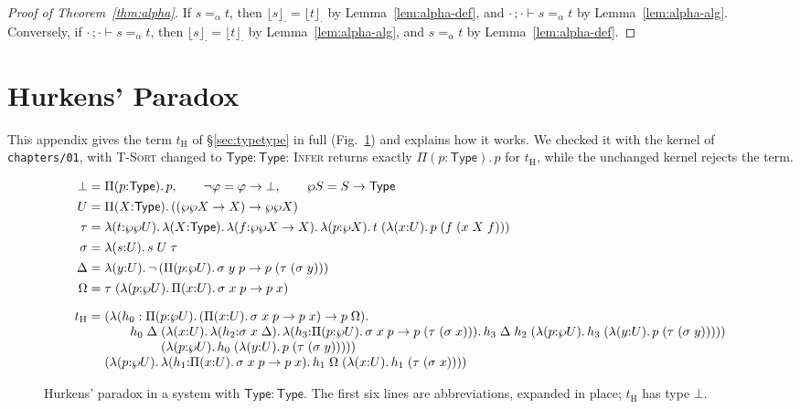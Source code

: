 \documentclass[acmsmall,screen,nonacm]{acmart}
\newcommand{\tPi}[3]{\Pi(#1{:}#2).\,#3}
\newcommand{\tLam}[3]{\lambda(#1{:}#2).\,#3}
\newcommand{\alphaeq}{=_{\alpha}}
\newcommand{\db}[2]{\lfloor #1 \rfloor_{#2}}
\begin{document}
\begin{proof}[Proof of Theorem~\ref{thm:alpha}]
If $s \alphaeq t$, then $\db{s}{\cdot} = \db{t}{\cdot}$ by Lemma~\ref{lem:alpha-def}, and $\cdot\,;\cdot \vdash s \alphaeq t$ by Lemma~\ref{lem:alpha-alg}.
Conversely, if $\cdot\,;\cdot \vdash s \alphaeq t$, then $\db{s}{\cdot} = \db{t}{\cdot}$ by Lemma~\ref{lem:alpha-alg}, and $s \alphaeq t$ by Lemma~\ref{lem:alpha-def}.
\end{proof}

\section{Hurkens' Paradox}
\label{app:hurkens}

This appendix gives the term $t_{\mathrm{H}}$ of \S\ref{sec:typetype} in full (Fig.~\ref{fig:hurkens}) and explains how it works.
We checked it with the kernel of \texttt{chapters/01}, with \textsc{T-Sort} changed to $\mathsf{Type} : \mathsf{Type}$:
\textsc{Infer} returns exactly $\tPi{p}{\mathsf{Type}}{p}$ for $t_{\mathrm{H}}$, while the unchanged kernel rejects the term.

\begin{figure}[ht]
\footnotesize
\[
\begin{array}{r@{\;}c@{\;}l}
\bot &=& \tPi{p}{\mathsf{Type}}{p}, \qquad \neg\varphi = \varphi \to \bot, \qquad \wp S = S \to \mathsf{Type} \\[4pt]
U &=& \tPi{X}{\mathsf{Type}}{((\wp\wp X \to X) \to \wp\wp X)} \\[4pt]
\tau &=& \tLam{t}{\wp\wp U}{\tLam{X}{\mathsf{Type}}{\tLam{f}{\wp\wp X \to X}{\tLam{p}{\wp X}{t\;(\tLam{x}{U}{p\;(f\;(x\;X\;f))})}}}} \\[4pt]
\sigma &=& \tLam{s}{U}{s\;U\;\tau} \\[4pt]
\Delta &=& \tLam{y}{U}{\neg\,(\tPi{p}{\wp U}{\sigma\;y\;p \to p\;(\tau\;(\sigma\;y))})} \\[4pt]
\Omega &=& \tau\;(\tLam{p}{\wp U}{\tPi{x}{U}{\sigma\;x\;p \to p\;x}}) \\[10pt]
t_{\mathrm{H}} &=& (\lambda (h_0 : \tPi{p}{\wp U}{(\tPi{x}{U}{\sigma\;x\;p \to p\;x}) \to p\;\Omega}).\; \\
&& \qquad h_0\;\Delta\;(\tLam{x}{U}{\tLam{h_2}{\sigma\;x\;\Delta}{\tLam{h_3}{\tPi{p}{\wp U}{\sigma\;x\;p \to p\;(\tau\;(\sigma\;x))}}{
     h_3\;\Delta\;h_2\;(\tLam{p}{\wp U}{h_3\;(\tLam{y}{U}{p\;(\tau\;(\sigma\;y))})})}}}) \\
&& \qquad\phantom{h_0\;\Delta\;}(\tLam{p}{\wp U}{h_0\;(\tLam{y}{U}{p\;(\tau\;(\sigma\;y))})})) \\
&& (\tLam{p}{\wp U}{\tLam{h_1}{\tPi{x}{U}{\sigma\;x\;p \to p\;x}}{h_1\;\Omega\;(\tLam{x}{U}{h_1\;(\tau\;(\sigma\;x))})}})
\end{array}
\]
\caption{Hurkens' paradox in a system with $\mathsf{Type} : \mathsf{Type}$. The first six lines are abbreviations, expanded in place; $t_{\mathrm{H}}$ has type $\bot$.}
\label{fig:hurkens}
\end{figure}
\end{document}
